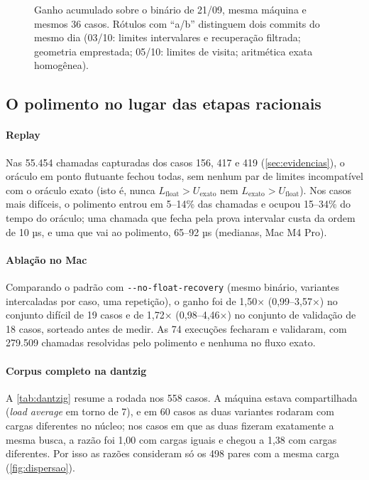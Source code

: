 \documentclass[11pt,a4paper]{article}
\theoremstyle{plain}\newtheorem{proposicao}{Proposição}
\theoremstyle{definition}\newtheorem{definicao}{Definição}
\theoremstyle{plain}\newtheorem{teorema}{Teorema}
\newcommand{\code}[1]{\texttt{\small #1}}
\begin{document}
\begin{figure}[ht]\centering\fighistorico
\caption{Ganho acumulado sobre o binário de 21/09, mesma máquina e mesmos 36 casos. Rótulos com ``a/b'' distinguem dois commits do mesmo dia (03/10: limites intervalares e recuperação filtrada; geometria emprestada; 05/10: limites de visita; aritmética exata homogênea).}\label{fig:historico}
\end{figure}

\subsection{O polimento no lugar das etapas racionais}
\paragraph{Replay} Nas 55.454 chamadas capturadas dos casos 156, 417 e 419 (\cref{sec:evidencias}), o oráculo em ponto flutuante fechou todas, sem nenhum par de limites incompatível com o oráculo exato (isto é, nunca \(L_{\text{float}}>U_{\text{exato}}\) nem \(L_{\text{exato}}>U_{\text{float}}\)). Nos casos mais difíceis, o polimento entrou em 5–14\% das chamadas e ocupou 15–34\% do tempo do oráculo; uma chamada que fecha pela prova intervalar custa da ordem de 10 µs, e uma que vai ao polimento, 65–92 µs (medianas, Mac M4 Pro).

\paragraph{Ablação no Mac} Comparando o padrão com \code{-{}-no-float-recovery} (mesmo binário, variantes intercaladas por caso, uma repetição), o ganho foi de 1,50× (0,99–3,57×) no conjunto difícil de 19 casos e de 1,72× (0,98–4,46×) no conjunto de validação de 18 casos, sorteado antes de medir. As 74 execuções fecharam e validaram, com 279.509 chamadas resolvidas pelo polimento e nenhuma no fluxo exato.

\paragraph{Corpus completo na dantzig} A \cref{tab:dantzig} resume a rodada nos 558 casos. A máquina estava compartilhada (\emph{load average} em torno de 7), e em 60 casos as duas variantes rodaram com cargas diferentes no núcleo; nos casos em que as duas fizeram exatamente a mesma busca, a razão foi 1,00 com cargas iguais e chegou a 1,38 com cargas diferentes. Por isso as razões consideram só os 498 pares com a mesma carga (\cref{fig:dispersao}).
\end{document}
